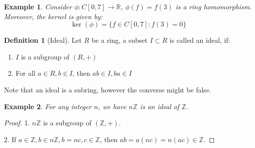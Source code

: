 \documentclass{article}
\theoremstyle{MyNonumberplain}
\theoremstyle{break}
\newtheorem*{proof}{Proof. }
\theoremstyle{break}
\newtheorem{example}{Example}[section]
\theoremstyle{break}
\theoremstyle{definition}
\theoremstyle{break}
\newtheorem{definition}{Definition}[section]
\begin{document}
\begin{expbox}
    \begin{example}
        Consider $\phi : C [0, 7] \rightarrow \mathbb{R}$, $\phi (f) = f (3)$ is a
        ring homomorphism. Moreover, the kernel is given by:
        \[ \ker (\phi) = \{ f \in C [0, 7] : f (3) = 0 \} \]
    \end{example}
\end{expbox}

\begin{defbox}
    \begin{definition}[Ideal]
        Let $R$ be a ring, a subset $I \subset R$ is called an ideal, if:\\
        \begin{enumerate}
          \item $I$ is a subgroup of $(R, +)$\\
          
          \item For all $a \in R, b \in I$, then $a b \in I, b a \in I$\\
        \end{enumerate}
        Note that an ideal is a subring, however the converse might be false.
    \end{definition}
\end{defbox}

\begin{expbox}
    \begin{example}
        For any integer $n$, we have $n\mathbb{Z}$ is an ideal of $\mathbb{Z}$.
    \end{example}
    \begin{prfbox}
        \begin{proof}
            1. $n\mathbb{Z}$ is a subgroup of $(\mathbb{Z}, +)$.\bigskip

            2. If $a \in \mathbb{Z}, b \in n\mathbb{Z}, b = n c, c \in \mathbb{Z}$, then
            $a b = a (n c) = n (a c) \in \mathbb{Z}$.
        \end{proof}
    \end{prfbox}
\end{expbox}
\end{document}
